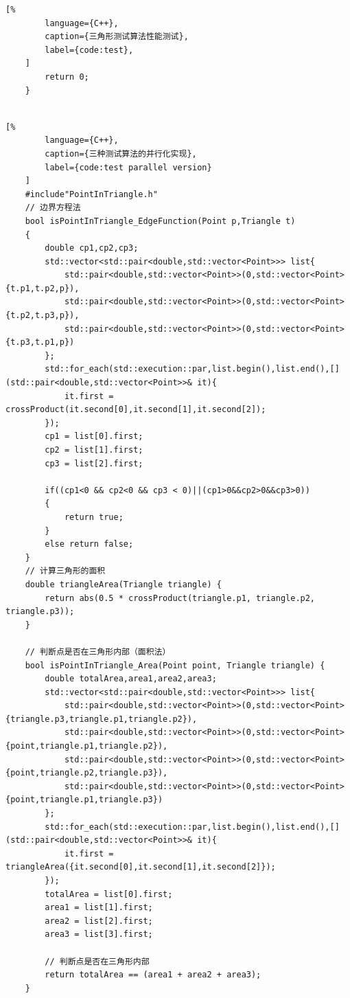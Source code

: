 {\begin{lstlisting}[%
        language={C++},
        caption={三角形测试算法性能测试},
        label={code:test},
    ]
        return 0;
    }
    
    \end{lstlisting}
    


    \begin{lstlisting}[%
        language={C++},
        caption={三种测试算法的并行化实现},
        label={code:test parallel version}
    ]
    #include"PointInTriangle.h"
    // 边界方程法
    bool isPointInTriangle_EdgeFunction(Point p,Triangle t)
    {
        double cp1,cp2,cp3;
        std::vector<std::pair<double,std::vector<Point>>> list{
            std::pair<double,std::vector<Point>>(0,std::vector<Point>{t.p1,t.p2,p}),
            std::pair<double,std::vector<Point>>(0,std::vector<Point>{t.p2,t.p3,p}),
            std::pair<double,std::vector<Point>>(0,std::vector<Point>{t.p3,t.p1,p})
        };
        std::for_each(std::execution::par,list.begin(),list.end(),[](std::pair<double,std::vector<Point>>& it){
            it.first = crossProduct(it.second[0],it.second[1],it.second[2]);
        });
        cp1 = list[0].first;
        cp2 = list[1].first;
        cp3 = list[2].first;

        if((cp1<0 && cp2<0 && cp3 < 0)||(cp1>0&&cp2>0&&cp3>0))
        {
            return true;
        }
        else return false;
    }
    // 计算三角形的面积
    double triangleArea(Triangle triangle) {
        return abs(0.5 * crossProduct(triangle.p1, triangle.p2, triangle.p3));
    }
    
    // 判断点是否在三角形内部（面积法）
    bool isPointInTriangle_Area(Point point, Triangle triangle) {
        double totalArea,area1,area2,area3;
        std::vector<std::pair<double,std::vector<Point>>> list{
            std::pair<double,std::vector<Point>>(0,std::vector<Point>{triangle.p3,triangle.p1,triangle.p2}),
            std::pair<double,std::vector<Point>>(0,std::vector<Point>{point,triangle.p1,triangle.p2}),
            std::pair<double,std::vector<Point>>(0,std::vector<Point>{point,triangle.p2,triangle.p3}),
            std::pair<double,std::vector<Point>>(0,std::vector<Point>{point,triangle.p1,triangle.p3})
        };
        std::for_each(std::execution::par,list.begin(),list.end(),[](std::pair<double,std::vector<Point>>& it){
            it.first = triangleArea({it.second[0],it.second[1],it.second[2]});
        });
        totalArea = list[0].first;
        area1 = list[1].first;
        area2 = list[2].first;
        area3 = list[3].first;

        // 判断点是否在三角形内部
        return totalArea == (area1 + area2 + area3);
    }
    

\end{lstlisting}}
